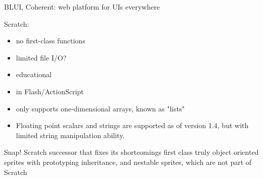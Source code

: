BLUI, Coherent: web platform for UIs everywhere
        
   
    
Scratch:
\begin{itemize}
    \item  no first-class functions
    \item  limited file I/O?
    \item  educational
    \item  in Flash/ActionScript
    \item  only supports one-dimensional arrays, known as "lists"
    \item  Floating point scalars and strings are supported as of version 1.4, but with limited string manipulation ability.
\end{itemize}
    

Snap!
    Scratch successor that fixes its shortcomings
    first class truly object oriented sprites with prototyping inheritance, and nestable sprites, which are not part of Scratch
    

